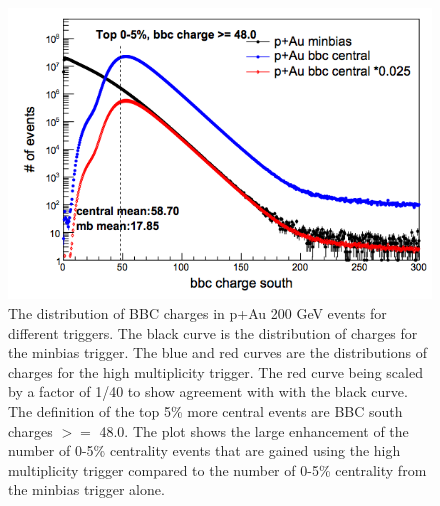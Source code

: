 \begin{figure}[h!]
\begin{center}
\includegraphics[scale=0.55]{figs/pAu_centrality_trigger.png}
\end{center}
\caption{The distribution of BBC charges in p+Au 200 GeV events for different triggers. The black curve is the distribution of charges for the minbias trigger. The blue and red curves are the distributions of charges for the high multiplicity trigger. The red curve being scaled by a factor of 1/40 to show agreement with with the black curve. The definition of the top 5\% more central events are BBC south charges $>=$ 48.0. The plot shows the large enhancement of the number of 0-5\% centrality events that are gained using the high multiplicity trigger compared to the number of 0-5\% centrality from the minbias trigger alone.}\label{fig:pau_centrality_trig}

\end{figure}

